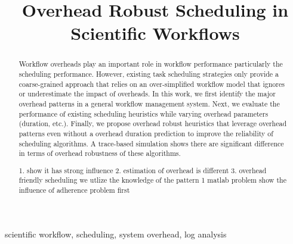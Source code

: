 \documentclass[final]{IEEEtran}
\begin{document}
\title{Overhead Robust Scheduling in Scientific Workflows}

\author{

}

\maketitle


\begin{abstract}
Workflow overheads play an important role in workflow performance particularly the scheduling performance. However, existing task scheduling strategies only provide a coarse-grained approach that relies on an over-simplified workflow model that ignores or underestimate the impact of overheads. In this work, we first identify the major overhead patterns in a general workflow management system. Next, we evaluate the performance of existing scheduling heuristics while varying overhead parameters (duration, etc.). Finally, we propose overhead robust heuristics that leverage overhead patterns even without a overhead duration prediction to improve the reliability of scheduling algorithms. A trace-based simulation shows there are significant difference in terms of overhead robustness of these algorithms. 

1. show it has strong influence
2. estimation of overhead is different
3. overhead friendly scheduling we utlize the knowledge of the pattern 1 matlab problem show the influence of adherence problem first


\end{abstract}

\begin{IEEEkeywords}
scientific workflow, scheduling, system overhead, log analysis
\end{IEEEkeywords}

\IEEEpeerreviewmaketitle
\end{document}
